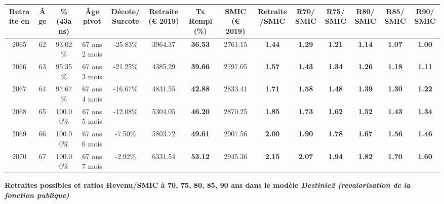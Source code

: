 \begin{adjustbox}{max width=\textwidth} 
\begin{tabular}[htb]{|c|c||c|c|c||c|c||c|c||c|c|c|c|c|} 
\hline 
 Retraite en &  Âge &  \%(43ans) &  Âge pivot &  Décote/Surcote &  Retraite (\euro{} 2019) &  Tx Rempl(\%) &  SMIC (\euro{} 2019) &  Retraite/SMIC &  R70/SMIC &  R75/SMIC &  R80/SMIC &  R85/SMIC &  R90/SMIC \\ 
\hline \hline 
 2065 &  62 &  93.02\% &  67 ans 2 mois &  -25.83\% &  3964.37 &  {\bf 36.53} &  2761.15 &  {\bf 1.44} &  {\bf 1.29} &  {\bf 1.21} &  {\bf 1.14} &  {\bf 1.07} &  {\bf 1.00} \\ 
\hline 
 2066 &  63 &  95.35\% &  67 ans 3 mois &  -21.25\% &  4385.29 &  {\bf 39.66} &  2797.05 &  {\bf 1.57} &  {\bf 1.43} &  {\bf 1.34} &  {\bf 1.26} &  {\bf 1.18} &  {\bf 1.11} \\ 
\hline 
 2067 &  64 &  97.67\% &  67 ans 4 mois &  -16.67\% &  4831.55 &  {\bf 42.88} &  2833.41 &  {\bf 1.71} &  {\bf 1.58} &  {\bf 1.48} &  {\bf 1.39} &  {\bf 1.30} &  {\bf 1.22} \\ 
\hline 
 2068 &  65 &  100.00\% &  67 ans 5 mois &  -12.08\% &  5304.05 &  {\bf 46.20} &  2870.25 &  {\bf 1.85} &  {\bf 1.73} &  {\bf 1.62} &  {\bf 1.52} &  {\bf 1.43} &  {\bf 1.34} \\ 
\hline 
 2069 &  66 &  100.00\% &  67 ans 6 mois &  -7.50\% &  5803.72 &  {\bf 49.61} &  2907.56 &  {\bf 2.00} &  {\bf 1.90} &  {\bf 1.78} &  {\bf 1.67} &  {\bf 1.56} &  {\bf 1.46} \\ 
\hline 
 2070 &  67 &  100.00\% &  67 ans 7 mois &  -2.92\% &  6331.54 &  {\bf 53.12} &  2945.36 &  {\bf 2.15} &  {\bf 2.07} &  {\bf 1.94} &  {\bf 1.82} &  {\bf 1.70} &  {\bf 1.60} \\ 
\hline 
\hline 
\end{tabular} 
\end{adjustbox} 
 
 \vspace{0.1cm} 
{\bf \noindent Retraites possibles et ratios Revenu/SMIC à 70, 75, 80, 85, 90 ans dans le modèle \emph{Destinie2 (revalorisation de la fonction publique)}}  
 
